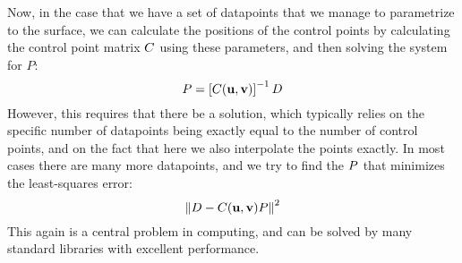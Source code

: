 Now, in the case that we have a set of datapoints that we manage to parametrize to the surface, we can calculate the positions of the control points by calculating the control point matrix $\lsControlPointCoefMatrix$ using these parameters, and then solving the system for $P$:
\begin{equation*}
\lsControlPointMatrix = \left[\lsControlPointCoefMatrix(\vec{u},\vec{v})\right]^{-1}\lsDataPointMatrix
\end{equation*}
However, this requires that there be a solution, which typically relies on the specific number of datapoints being exactly equal to the number of control points, and on the fact that here we also interpolate the points exactly. In most cases there are many more datapoints, and we try to find the $\lsControlPointMatrix$ that minimizes the least-squares error:
\begin{equation}
\norm{\lsDataPointMatrix - \lsControlPointCoefMatrix(\vec{u},\vec{v})\lsControlPointMatrix}^2
\label{eqn:lsminim}
\end{equation}
This again is a central problem in computing, and can be solved by many standard libraries with excellent performance.

